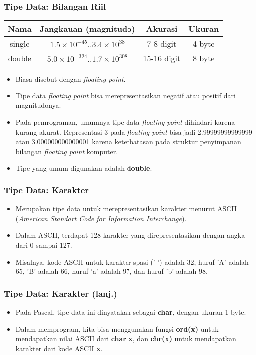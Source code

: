 \documentclass{beamer}
\begin{document}
\begin{frame}
\frametitle{Tipe Data: Bilangan Riil}
\begin{table}[ht]
    \begin{tabular}{|c|c|c|c|}
        \hline Nama  & Jangkauan (magnitudo) & Akurasi & Ukuran \\
        \hline single & $1.5\times10^{-45} .. 3.4\times10^{38}$ & 7-8 digit & 4 byte\\
        \hline double & $5.0\times10^{-324} .. 1.7\times10^{308}$ & 15-16 digit & 8 byte \\
        \hline
    \end{tabular}
\end{table}
\begin{itemize}
    \item Biasa disebut dengan \textit{floating point}.
    \item Tipe data \textit{floating point} bisa merepresentasikan negatif atau positif dari magnitudonya.
    \item Pada pemrograman, umumnya tipe data \textit{floating point} dihindari karena kurang akurat. Representasi 3 pada \textit{floating point} bisa jadi 2.99999999999999 atau 3.000000000000001 karena keterbatasan pada struktur penyimpanan bilangan \textit{floating point} komputer.
    \item Tipe yang umum digunakan adalah \alert{\textbf{double}}.
\end{itemize}
\end{frame}

\begin{frame}
\frametitle{Tipe Data: Karakter}
\begin{itemize}
    \item Merupakan tipe data untuk merepresentasikan karakter menurut ASCII (\textit{American Standart Code for Information Interchange}).
    \item Dalam ASCII, terdapat 128 karakter yang direpresentasikan dengan angka dari 0 sampai 127.
    \item Misalnya, kode ASCII untuk karakter spasi (' ') adalah 32, huruf 'A' adalah 65, 'B' adalah 66, huruf 'a' adalah 97, dan huruf 'b' adalah 98.
\end{itemize}
\end{frame}

\begin{frame}
\frametitle{Tipe Data: Karakter (lanj.)}
\begin{itemize}
    \item Pada Pascal, tipe data ini dinyatakan sebagai \alert{\textbf{char}}, dengan ukuran 1 byte.
    \item Dalam memprogram, kita bisa menggunakan fungsi \textbf{ord(x)} untuk mendapatkan nilai ASCII dari \textbf{char x}, dan \textbf{chr(x)} untuk mendapatkan karakter dari kode ASCII \textbf{x}.
\end{itemize}
\end{frame}
\end{document}
